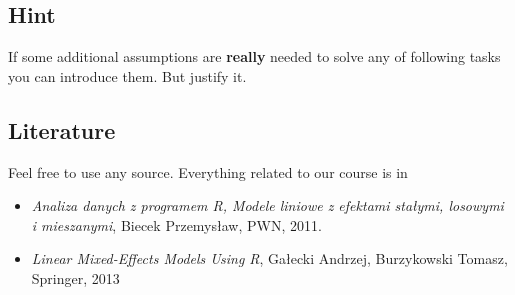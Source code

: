 \documentclass[a4paper,11pt,twoside,openany]{article}
\begin{document}
\subsection*{Hint}

If some additional assumptions are \textbf{really} needed to solve any of following tasks you can introduce them. But justify it.

\subsection*{Literature}

Feel free to use any source. Everything related to our course is in

\begin{itemize}
\item \textit{Analiza danych z programem R, Modele liniowe z efektami stałymi, losowymi i mieszanymi}, Biecek Przemysław, PWN, 2011.
\item \textit{Linear Mixed-Effects Models Using R}, Gałecki Andrzej, Burzykowski Tomasz, Springer, 2013
\end{itemize}
\end{document}
